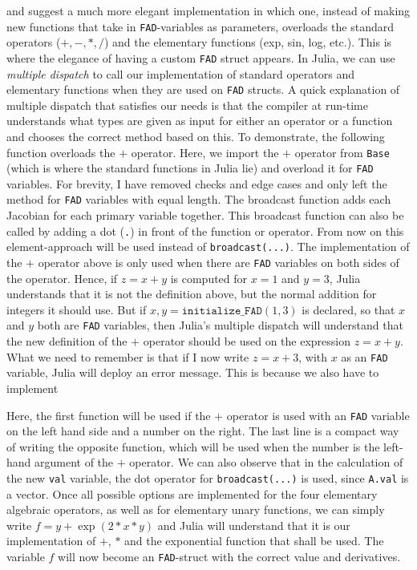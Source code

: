 \cite{doi:10.1137/080743627} and \cite{lieMrstUrl} suggest a much more elegant implementation in which one, instead of making new functions that take in \texttt{FAD}-variables as parameters, overloads the standard operators ($+,-,*,/$) and the elementary functions (exp, sin, log, etc.). This is where the elegance of having a custom \texttt{FAD} struct appears. In Julia, we can use \emph{multiple dispatch} to call our implementation of standard operators and elementary functions when they are used on \texttt{FAD} structs. A quick explanation of multiple dispatch that satisfies our needs is that the compiler at run-time understands what types are given as input for either an operator or a function and chooses the correct method based on this. To demonstrate, the following function  
overloads the $+$ operator. Here, we import the $+$ operator from \texttt{Base} (which is where the standard functions in Julia lie) and overload it for \texttt{FAD} variables. For brevity, I have removed checks and edge cases and only left the method for \texttt{FAD} variables with equal length. The broadcast function adds each Jacobian for each primary variable together. This broadcast function can also be called by adding a dot (\texttt{.}) in front of the function or operator. From now on this element-approach will be used instead of \texttt{broadcast(...)}. The implementation of the $+$ operator above is only used when there are \texttt{FAD} variables on both sides of the operator. Hence, if $z = x+y$ is computed for $x = 1$ and $y = 3$, Julia understands that it is not the definition above, but the normal addition for integers it should use. But if $x,y = \texttt{initialize\_FAD}(1,3)$ is declared, so that $x$ and $y$ both are \texttt{FAD} variables, then Julia's multiple dispatch will understand that the new definition of the $+$ operator should be used on the expression $z = x+y$. What we need to remember is that if I now write $z = x + 3$, with $x$ as an \texttt{FAD} variable, Julia will deploy an error message. This is because we also have to implement

Here, the first function will be used if the $+$ operator is used with an \texttt{FAD} variable on the left hand side and a number on the right. The last line is a compact way of writing the opposite function, which will be used when the number is the left-hand argument of the $+$ operator. We can also observe that in the calculation of the new \texttt{val} variable, the dot operator for \texttt{broadcast(...)} is used, since \texttt{A.val} is a vector. Once all possible options are implemented for the four elementary algebraic operators, as well as for elementary unary functions, we can simply write $f = y+\exp(2*x*y)$ and Julia will understand that it is our implementation of $+$, $*$ and the exponential function that shall be used. The variable $f$ will now become an \texttt{FAD}-struct with the correct value and derivatives. 

